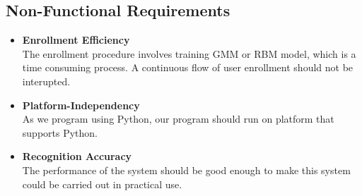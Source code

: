 \subsection{Non-Functional Requirements}
	\begin{itemize}
		\item \textbf{Enrollment Efficiency} \\
			The enrollment procedure involves training GMM or RBM model, which
			is a time consuming process. A continuous flow of user enrollment
			should not be interupted.
		\item \textbf{Platform-Independency} \\
			As we program using Python, our program should run on
			platform that supports Python.
		\item \textbf{Recognition Accuracy} \\
			The performance of the system should be good enough to
			make this system could be carried out in practical use.
	\end{itemize}

